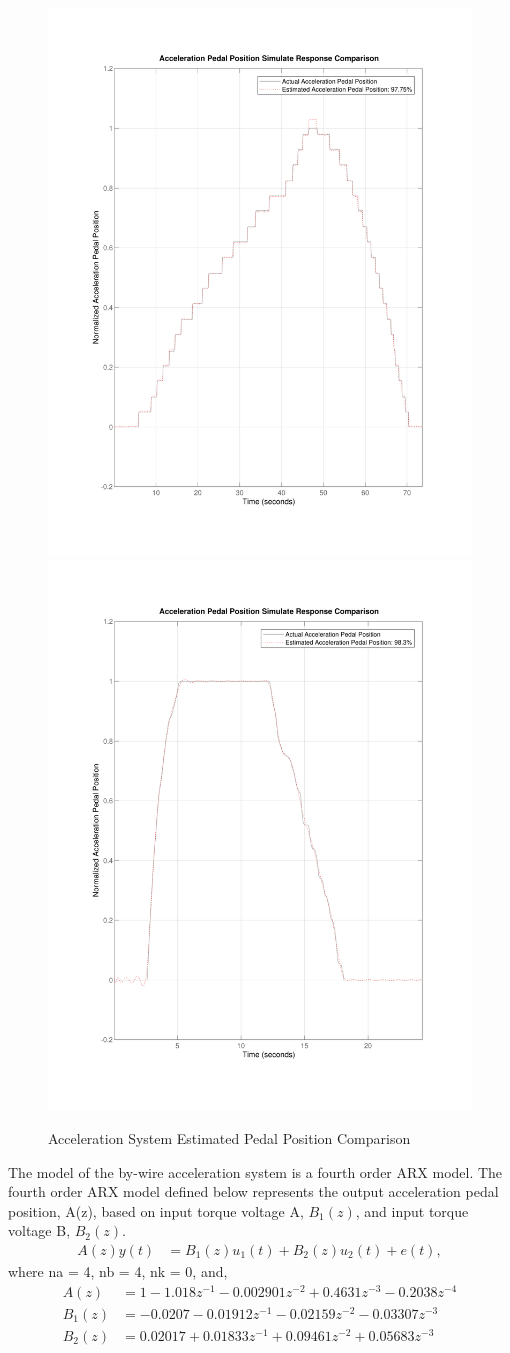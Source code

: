 \documentclass[journal,twoside,web]{ieeecolor}
\begin{document}
\begin{figure}[h]
	\centering
		{\includegraphics[width=0.48\linewidth]{figs/img/byWireAccelArxModel}}
		{\includegraphics[width=0.48\linewidth]{figs/img/manualAccelTransferFunctionModel}}
	\caption{Acceleration System Estimated Pedal Position Comparison}
\end{figure}

\vspace{12pt}
\noindent The model of the by-wire acceleration system is a fourth order ARX model. The fourth order ARX model defined below represents the output acceleration pedal position, A(z), based on input torque voltage A, $B_1(z)$, and input torque voltage B, $B_2(z)$. 
% 
	\begin{align*}
		A(z)y(t) &= B_1(z)u_1(t) + B_2(z)u_2(t) + e(t),
	\end{align*}
	where na = 4, nb = 4, nk = 0, and, 
  \begin{align*}
		A(z) &= 1 - 1.018z^{-1} - 0.002901z^{-2} + 0.4631z^{-3} - 0.2038z^{-4}\\
    B_1(z) &= -0.0207 - 0.01912z^{-1} - 0.02159z^{-2} - 0.03307z^{-3}\\
		B_2(z) &= 0.02017 + 0.01833z^{-1} + 0.09461z^{-2} + 0.05683z^{-3}
  \end{align*}
%
\end{document}

